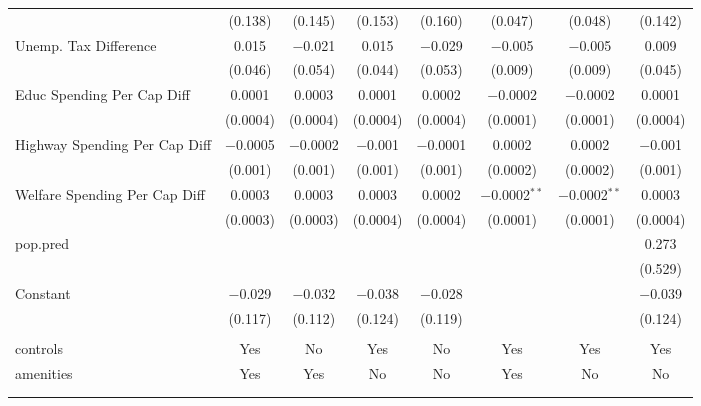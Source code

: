 \begin{table}[!htbp]
\begin{tabular}{@{\extracolsep{5pt}}lccccccc}
  & (0.138) & (0.145) & (0.153) & (0.160) & (0.047) & (0.048) & (0.142) \\ 
  Unemp. Tax Difference & 0.015 & $-$0.021 & 0.015 & $-$0.029 & $-$0.005 & $-$0.005 & 0.009 \\ 
  & (0.046) & (0.054) & (0.044) & (0.053) & (0.009) & (0.009) & (0.045) \\ 
  Educ Spending Per Cap Diff & 0.0001 & 0.0003 & 0.0001 & 0.0002 & $-$0.0002 & $-$0.0002 & 0.0001 \\ 
  & (0.0004) & (0.0004) & (0.0004) & (0.0004) & (0.0001) & (0.0001) & (0.0004) \\ 
  Highway Spending Per Cap Diff & $-$0.0005 & $-$0.0002 & $-$0.001 & $-$0.0001 & 0.0002 & 0.0002 & $-$0.001 \\ 
  & (0.001) & (0.001) & (0.001) & (0.001) & (0.0002) & (0.0002) & (0.001) \\ 
  Welfare Spending Per Cap Diff & 0.0003 & 0.0003 & 0.0003 & 0.0002 & $-$0.0002$^{**}$ & $-$0.0002$^{**}$ & 0.0003 \\ 
  & (0.0003) & (0.0003) & (0.0004) & (0.0004) & (0.0001) & (0.0001) & (0.0004) \\ 
  pop.pred &  &  &  &  &  &  & 0.273 \\ 
  &  &  &  &  &  &  & (0.529) \\ 
  Constant & $-$0.029 & $-$0.032 & $-$0.038 & $-$0.028 &  &  & $-$0.039 \\ 
  & (0.117) & (0.112) & (0.124) & (0.119) &  &  & (0.124) \\ 
 \hline \\[-1.8ex] 
controls & Yes & No & Yes & No & Yes & Yes & Yes \\ 
amenities & Yes & Yes & No & No & Yes & No & No \\ 
\hline \\[-1.8ex] 
\hline 
\hline \\[-1.8ex] 
\end{tabular} 
\end{table} 
